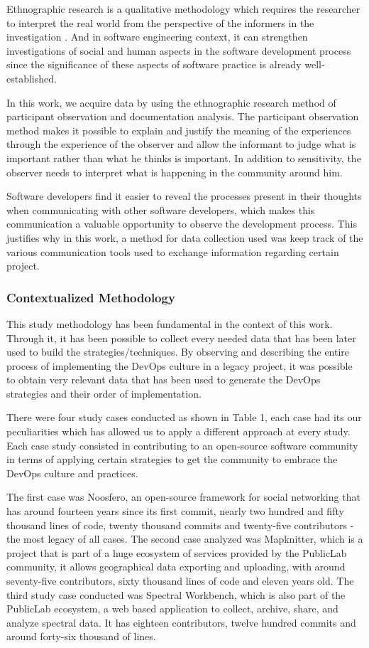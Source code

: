 Ethnographic research is a qualitative methodology which requires the researcher
to interpret the real world from the perspective of the informers in the
investigation \cite{dobbert1982}. And  in software engineering context, it can
strengthen investigations of social and human aspects in the software
development process since the significance of these aspects of software practice
is already well-established.

In this work, we acquire data by using the ethnographic research method of
participant observation and documentation analysis. The participant observation
method makes it possible to explain and justify the meaning of the experiences
through the experience of the observer and allow the informant to judge what is
important rather than what he thinks is important. In addition to sensitivity,
the observer needs to interpret what is happening in the community around him. 

Software developers find it easier to reveal the processes present in their
thoughts when communicating with other software developers, which makes this
communication a valuable opportunity to observe the development process. This
justifies why in this work, a method for data collection used was keep track of
the various communication tools used to exchange information regarding certain
project.

\subsubsection{Contextualized Methodology}

This study methodology has been fundamental in the context of this work. Through
it, it has been possible to collect every needed data that has been later used
to build the strategies/techniques. By observing and describing the entire
process of implementing the DevOps culture in a legacy project, it was possible
to obtain very relevant data that has been used to generate the DevOps
strategies and their order of implementation. 

There were four study cases conducted as shown in Table 1, each case had its our
peculiarities which has allowed us to apply a different approach at every study.
Each case study consisted in contributing to an open-source software community
in terms of applying certain strategies to get the community to embrace the
DevOps culture and practices.

The first case was Noosfero, an open-source framework for social networking that
has around fourteen years since its first commit, nearly two hundred and fifty
thousand lines of code, twenty thousand commits and twenty-five contributors -
the most legacy of all cases. The second case analyzed was Mapknitter, which is
a project that is part of a huge ecosystem of services provided by the PublicLab
community, it allows geographical data exporting and uploading, with around
seventy-five contributors, sixty thousand lines of code and eleven years old.
The third study case conducted was Spectral Workbench, which is also part of the
PublicLab ecosystem, a web based application to collect, archive, share, and
analyze spectral data. It has eighteen contributors, twelve hundred commits and
around forty-six thousand of lines.

